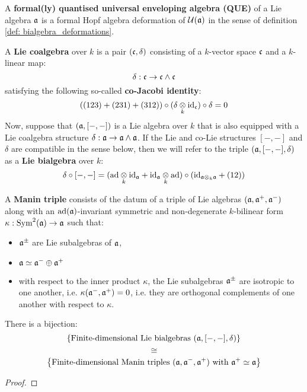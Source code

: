         \begin{definition} \label{def: formal_QUEs}
            A \textbf{formal(ly) quantised universal enveloping algebra (QUE)} of a Lie algebra $\mathfrak{a}$ is a formal Hopf algebra deformation of $\mathcal{U}(\mathfrak{a})$ in the sense of definition \ref{def: bialgebra_deformations}.
        \end{definition}
    
        \begin{definition} \label{def: lie_co/bialgebras}
            A \textbf{Lie coalgebra} over $k$ is a pair $(\mathfrak{c}, \delta)$ consisting of a $k$-vector space $\mathfrak{c}$ and a $k$-linear map:
                $$\delta: \mathfrak{c} \to \mathfrak{c} \wedge \mathfrak{c}$$
            satisfying the following so-called \textbf{co-Jacobi identity}:
                $$((123) + (231) + (312)) \circ (\delta \tensor_k \id_\c) \circ \delta = 0$$
            Now, suppose that $(\mathfrak{a}, [-, -])$ is a Lie algebra over $k$ that is also equipped with a Lie coalgebra structure $\delta: \mathfrak{a} \to \mathfrak{a} \wedge \mathfrak{a}$. If the Lie and co-Lie structures $[-, -]$ and $\delta$ are compatible in the sense below, then we will refer to the triple $(\mathfrak{a}, [-, -], \delta)$ as a \textbf{Lie bialgebra} over $k$:
                $$\delta \circ [-, -] = (\ad \tensor_k \id_{\a} + \id_{\a} \tensor_k \ad) \circ (\id_{\a \tensor_k \a} + (12))$$
        \end{definition}
        \begin{definition} \label{def: manin_triples}
            A \textbf{Manin triple} consists of the datum of a triple of Lie algebras $(\mathfrak{a}, \mathfrak{a}^+, \mathfrak{a}^-)$ along with an $\mathrm{ad}(\mathfrak{a})$-invariant symmetric and non-degenerate $k$-bilinear form $\kappa: \mathrm{Sym}^2(\mathfrak{a}) \to \mathfrak{a}$ such that:
                \begin{itemize}
                    \item $\mathfrak{a}^{\pm}$ are Lie subalgebras of $\mathfrak{a}$,
                    \item $\mathfrak{a} \simeq \mathfrak{a}^- \oplus \mathfrak{a}^+$
                    \item with respect to the inner product $\kappa$, the Lie subalgebras $\mathfrak{a}^{\pm}$ are isotropic to one another, i.e. $\kappa(\mathfrak{a}^-, \mathfrak{a}^+) = 0$, i.e. they are orthogonal complements of one another with respect to $\kappa$.
                \end{itemize}
        \end{definition}
        \begin{proposition} \label{prop: manin_triples_classify_lie_bialgebras}
            There is a bijection:
                $$\left\{ \text{Finite-dimensional Lie bialgebras $(\mathfrak{a}, [-, -], \delta)$} \right\}$$
                $$\cong$$
                $$\left\{ \text{Finite-dimensional Manin triples $(\mathfrak{a}, \mathfrak{a}^-, \mathfrak{a}^+)$ with $\mathfrak{a}^+ \simeq \mathfrak{a}$} \right\}$$
        \end{proposition}
            \begin{proof}
                 
            \end{proof}
        \begin{example}
        \end{example}
        
